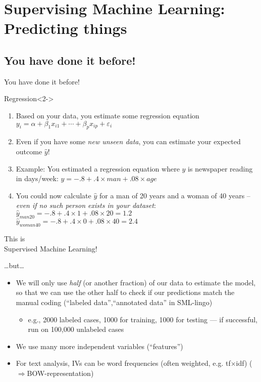 
\section[Predicting things] {Supervising Machine Learning: Predicting things}






\subsection{You have done it before!}
\begin{frame}{You have done it before!}
	\begin{block}{Regression}<2->
		\begin{enumerate}
			\item<3-> Based on your data, you estimate some regression equation 	$y_i = \alpha + \beta_1 x_{i1} + \cdots + \beta_p x_{ip} + \varepsilon_i$
			\item<4-> Even if you have some \emph{new unseen data}, you can estimate your expected outcome $\hat{y}$!
			\item<5-> Example: You estimated a regression equation where $y$ is newspaper reading in days/week: $y = -.8 + .4 \times man + .08 \times age$
			\item<6-> You could now calculate $\hat{y}$ for a man of 20 years and a woman of 40 years -- \emph{even if no such person exists in your dataset}: \\
			$\hat{y}_{man20} = -.8 + .4 \times 1 + .08 \times 20 = 1.2$ \\
			$\hat{y}_{woman40} = -.8 + .4 \times 0 + .08 \times 40 = 2.4$
		\end{enumerate}
	\end{block}	
	
\end{frame}



\begin{frame}{}
	\huge{This is\\ Supervised Machine Learning!}
\end{frame}

\begin{frame}{\ldots but\ldots}
	\begin{itemize}
		\item<1-> We will only use \emph{half} {\tiny{(or another fraction)}} of our data to estimate the model, so that we can use the other half to check if our predictions match the manual coding (``labeled data'',``annotated data'' in SML-lingo)
		\begin{itemize}
			\item<2->e.g., 2000 labeled cases, 1000 for training, 1000 for testing --- if successful, run on 100,000 unlabeled cases
		\end{itemize}
		\item<3-> We use many more independent variables (``features'')
		\item<4-> For text analysis, IVs can be word frequencies (often weighted, e.g. tf$\times$idf) ($\Rightarrow$BOW-representation)
	\end{itemize}
\end{frame}


